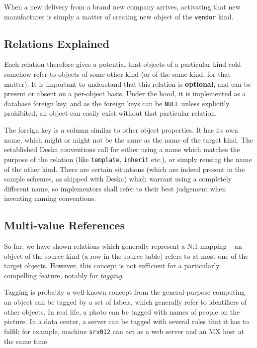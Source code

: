 \documentclass{article}
\begin{document}
When a new delivery from a brand new company arrives, activating that new manufacturer is simply a matter of
creating new object of the {\tt vendor} kind.

\subsection{Relations Explained}

Each relation therefore gives a potential that objects of a particular kind cold somehow refer to objects of some other
kind (or of the same kind, for that matter).  It is important to understand that this relation is {\bf optional}, and
can be present or absent on a per-object basis.  Under the hood, it is implemented as a database foreign key, and as the
foreign keys can be {\tt NULL} unless explicitly prohibited, an object can easily exist without that particular
relation.

The foreign key is a column similar to other object properties.  It has its own name, which might or might not be the
same as the name of the target kind.  The established Deska conventions call for either using a name which matches the
purpose of the relation (like {\tt template}, {\tt inherit} etc.), or simply reusing the name of the other kind.
There are certain situations (which are indeed present in the sample schemes, as shipped with Deska) which warrant using
a completely different name, so implementors shall refer to their best judgement when inventing naming conventions.

\subsection{Multi-value References}

So far, we have shown relations which generally represent a N:1 mapping -- an object of the source kind (a row in the
source table) refers to at most one of the target objects.  However, this concept is not sufficient for a particularly
compelling feature, notably for {\em tagging}.

Tagging is probably a well-known concept from the general-purpose computing -- an object can be tagged by a set of
labels, which generally refer to identifiers of other objects.  In real life, a photo can be tagged with names of people
on the picture.  In a data center, a server can be tagged with several roles that it has to fulfil; for example, machine
{\tt srv012} can act as a web server and an MX host at the same time.
\end{document}
